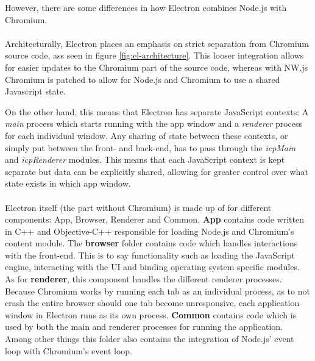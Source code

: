 However, there are some differences in how Electron combines Node.js with Chromium.\paragraph{}
Architecturally, Electron places an emphasis on strict separation from Chromium source code, ass seen in figure \ref{fig:el-architecture}.
This looser integration allows for easier updates to the Chromium part of the source code, whereas with NW.js Chromium
is patched to allow for Node.js and Chromium to use a shared Javascript state. \parencite{jensen2017}\par
On the other hand, this means that Electron has separate JavaScript contexts: A \emph{main} process which starts running
with the app window and a \emph{renderer} process for each individual window.
Any sharing of state between these contexts, or simply put between the front- and back-end, has to pass through the
\emph{icpMain} and \emph{icpRenderer} modules.
This means that each JavaScript context is kept separate but data can be explicitly shared, allowing for greater control
over what state exists in which app window. \parencite{jensen2017}\paragraph{}
Electron itself (the part without Chromium) is made up of for different components: App, Browser, Renderer and Common.
\textbf{App} contains code written in C++ and Objective-C++ responsible for loading Node.js and Chromium's content module.
The \textbf{browser} folder contains code which handles interactions with the front-end.
This is to say functionality such as loading the JavaScript engine, interacting with the UI and binding operating system
specific modules.
As for \textbf{renderer}, this component handles the different renderer processes.
Because Chromium works by running each tab as an individual process, as to not crash the entire browser should one
tab become unresponsive, each application window in Electron runs as its own process.
\textbf{Common} contains code which is used by both the main and renderer processes for running the application.
Among other things this folder also contains the integration of Node.js' event loop with Chromium's event loop. \parencite{jensen2017}\paragraph{}
